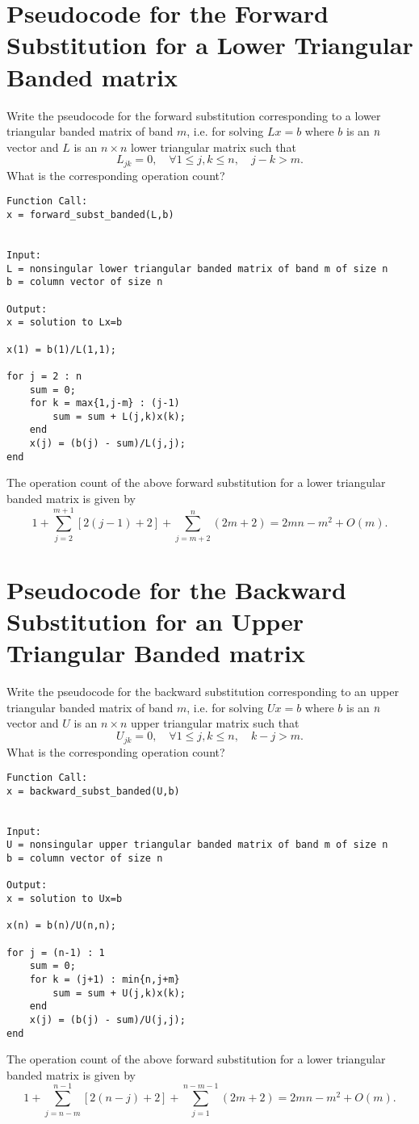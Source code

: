 \documentclass[paper=a4, fontsize=11pt]{scrartcl} %
\numberwithin{equation}{section} %
\numberwithin{figure}{section} %
\numberwithin{table}{section} %
\begin{document}
\section{Pseudocode for the Forward Substitution for a Lower Triangular Banded matrix}
Write the pseudocode for the forward substitution corresponding to a lower triangular banded matrix of band $m$, i.e. for solving
$Lx=b$ where $b$ is an $n\time 1$ vector and $L$ is an $n\times n$ lower triangular matrix such that
$$
L_{jk} = 0, \quad \forall 1\le j,k\le n, \quad j-k>m.
$$
What is the corresponding operation count?
\begin{lstlisting}
Function Call:
x = forward_subst_banded(L,b)


Input:
L = nonsingular lower triangular banded matrix of band m of size n
b = column vector of size n

Output:
x = solution to Lx=b

x(1) = b(1)/L(1,1);

for j = 2 : n
    sum = 0;
    for k = max{1,j-m} : (j-1)
        sum = sum + L(j,k)x(k);
    end
    x(j) = (b(j) - sum)/L(j,j);
end
\end{lstlisting}
The operation count of the above forward substitution for a lower triangular banded matrix is given by
$$
1 + \sum_{j=2}^{m+1} \left[2(j-1)+2\right] + \sum_{j=m+2}^{n} \left(2m+2\right) = 2mn - m^2 + O(m).
$$

\newpage
\section{Pseudocode for the Backward Substitution for an Upper Triangular Banded matrix}
Write the pseudocode for the backward substitution corresponding to an upper triangular banded matrix of band $m$, i.e. for solving
$Ux=b$ where $b$ is an $n\time 1$ vector and $U$ is an $n\times n$ upper triangular matrix such that
$$
U_{jk} = 0, \quad \forall 1\le j,k\le n, \quad k-j>m.
$$
What is the corresponding operation count?
\begin{lstlisting}
Function Call:
x = backward_subst_banded(U,b)


Input:
U = nonsingular upper triangular banded matrix of band m of size n
b = column vector of size n

Output:
x = solution to Ux=b

x(n) = b(n)/U(n,n);

for j = (n-1) : 1
    sum = 0;
    for k = (j+1) : min{n,j+m}
        sum = sum + U(j,k)x(k);
    end
    x(j) = (b(j) - sum)/U(j,j);
end
\end{lstlisting}
The operation count of the above forward substitution for a lower triangular banded matrix is given by
$$
1 + \sum_{j=n-m}^{n-1} \left[2(n-j)+2\right] + \sum_{j=1}^{n-m-1} \left(2m+2\right) = 2mn - m^2 + O(m).
$$
\end{document}
